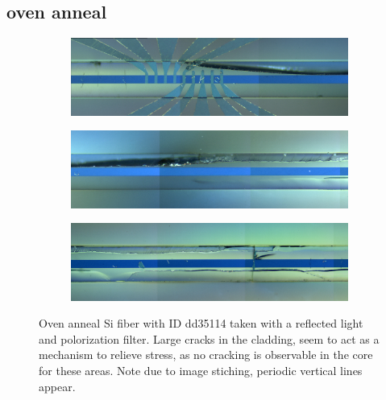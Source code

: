 \subsection{oven anneal}
\begin{figure}[h]
\centering
\begin{subfigure}{\textwidth}
  \centering
  \includegraphics[width=\linewidth]{fig/OA/dd35114_0A--01-1.jpg}
  \label{fig:sfig1}
\end{subfigure}%

\begin{subfigure}{\textwidth}
  \centering
  \includegraphics[width=\linewidth]{fig/OA/dd35114_0A--01-2.jpg}
  \label{fig:sfig2}
\end{subfigure}%

\begin{subfigure}{\textwidth}
  \centering
  \includegraphics[width=\linewidth]{fig/OA/dd35114_0A--01-3.jpg}
  \label{fig:sfig3}
\end{subfigure}
\caption{Oven anneal Si fiber with ID dd35114 taken with a reflected light and polorization filter. Large cracks in the cladding, seem to act as a mechanism to relieve stress, as no cracking is observable in the core for these areas. Note due to image stiching, periodic vertical lines appear. }
\label{fig:si_sige}
\end{figure}

